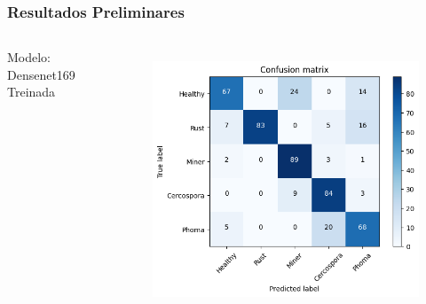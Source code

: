 \documentclass[aspectratio=169]{beamer}
\begin{document}
\begin{frame}
    \frametitle{Resultados Preliminares}

    \centering


    \begin{columns}



        \centering
        \tiny Modelo: Densenet169 Treinada
        \begin{figure}
            \centering
            \includegraphics[scale=0.39]{img/densenet169result1.png}
            \label{fig:enter-label}
        \end{figure}
        \centering




\end{columns}
\end{frame}
\end{document}
